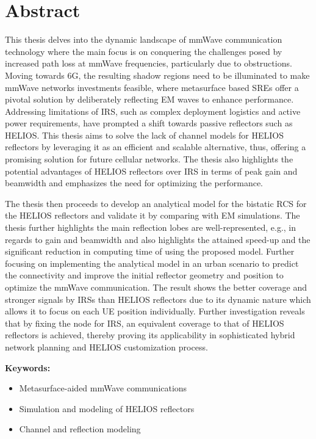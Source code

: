 \chapter*{Abstract}
\label{abstract}

This thesis delves into the dynamic landscape of \ac{mmWave} communication technology where the main focus is on conquering the challenges posed by increased path loss at \ac{mmWave} frequencies, particularly due to obstructions. Moving towards 6G, the resulting shadow regions need to be illuminated to make \ac{mmWave} networks investments feasible, where metasurface based \ac{SRE}s offer a pivotal solution by deliberately reflecting \ac{EM} waves to enhance performance. Addressing limitations of \ac{IRS}, such as complex deployment logistics and active power requirements, have prompted a shift towards passive reflectors such as \ac{HELIOS}. This thesis aims to solve the lack of channel models for \ac{HELIOS} reflectors by leveraging it as an efficient and scalable alternative, thus, offering a promising solution for future cellular networks. The thesis also highlights the potential advantages of HELIOS reflectors over \ac{IRS} in terms of peak gain and beamwidth and emphasizes the need for optimizing the performance.

The thesis then proceeds to develop an analytical model for the bistatic \ac{RCS} for the HELIOS reflectors and validate it by comparing with EM simulations. The thesis further highlights the main reflection lobes are well-represented, e.g., in regards to gain and beamwidth and also highlights the attained speed-up and the significant reduction in computing time of using the proposed model. Further focusing on implementing the analytical model in an urban scenario to predict the connectivity and improve the initial reflector geometry and position to optimize the \ac{mmWave} communication. The result shows the better coverage and stronger signals by IRSs than HELIOS reflectors due to its dynamic nature which allows it to focus on each UE position individually. Further investigation reveals that by fixing the node for IRS, an equivalent coverage to that of \ac{HELIOS} reflectors is achieved, thereby proving its applicability in sophisticated hybrid network planning and \ac{HELIOS} customization process.

\textbf{Keywords:}
\begin{itemize}
	\item Metasurface-aided mmWave communications
	\item Simulation and modeling of HELIOS reflectors
	\item Channel and reflection modeling
\end{itemize} 